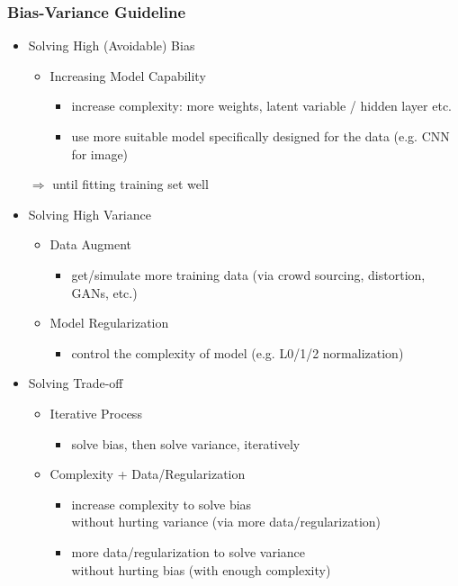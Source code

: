 \subsubsection{Bias-Variance Guideline}
\begin{itemize}
\item Solving High (Avoidable) Bias
	\begin{itemize}
	\item Increasing Model Capability
		\begin{itemize}
		\item increase complexity: more weights, latent variable / hidden layer etc.
		\item use more suitable model specifically designed for the data (e.g. CNN for image)
		\end{itemize}
	\end{itemize}
	$\Rightarrow$ until fitting training set well
\item Solving High Variance
	\begin{itemize}
	\item Data Augment
		\begin{itemize}
		\item get/simulate more training data (via crowd sourcing, distortion, GANs, etc.)
		\end{itemize}
	\item Model Regularization
		\begin{itemize}
		\item control the complexity of model (e.g. L0/1/2 normalization)
		\end{itemize}
	\end{itemize}
\item Solving Trade-off
	\begin{itemize}
	\item Iterative Process
		\begin{itemize}
		\item solve bias, then solve variance, iteratively
		\end{itemize}
	\item Complexity + Data/Regularization
		\begin{itemize}
		\item increase complexity to solve bias \\
		without hurting variance (via more data/regularization)
		\item more data/regularization to solve variance \\
		without hurting bias (with enough complexity)
		\end{itemize}
	\end{itemize}
\end{itemize}

